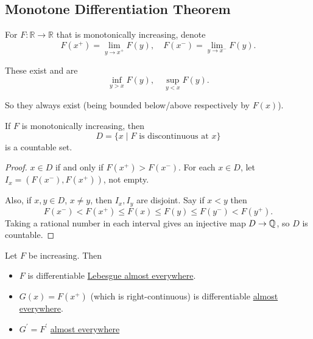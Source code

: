\subsection{Monotone Differentiation Theorem}
\begin{definition}[]\label{def:}
	For \(F \colon  \mathbb{R} \to \mathbb{R}\) that is monotonically increasing, denote
	\[
		F(x^+) = \lim_{y \to x^+} F(y), \quad F(x^-) = \lim_{y \to x^-} F(y).
	\]

	These exist and are
	\[
		\inf_{y > x} F(y),\quad \sup_{y < x} F(y).
	\]

	So they always exist (being bounded below/above respectively by \(F(x)\)).
\end{definition}

\begin{lemma}\label{lma:lec-33}
	If \(F\) is monotonically increasing, then
	\[
		D = \{x \mid F \text{ is discontinuous at } x\}
	\]
	is a countable set.
\end{lemma}

\begin{proof}
	\(x \in D\) if and only if \(F(x^+) > F(x^-)\). For each \(x \in D\), let \(I_x = (F(x^-),F(x^+))\), not empty.

	Also, if \(x,y \in D\), \(x \neq y\), then \(I_x,I_y\) are disjoint. Say if \(x < y\) then
	\[
		F(x^-) < F(x^+) \leq F(x) \leq F(y) \leq F(y^-) < F(y^+).
	\]
	Taking a rational number in each interval gives an injective map \(D \to \mathbb{\MakeUppercase{q}}\), so \(D\) is countable.
\end{proof}

\begin{theorem}\label{thm:monotone-differentiation}
	Let \(F\) be increasing. Then
	\begin{itemize}
		\item \(F\) is differentiable \hyperref[def:mu-almost-everywhere]{Lebesgue almost everywhere}.
		\item \(G(x) = F(x^+)\) (which is right-continuous) is differentiable \hyperref[def:mu-almost-everywhere]{almost everywhere}.
		\item \(G^\prime  = F^\prime \) \hyperref[def:mu-almost-everywhere]{almost everywhere}
	\end{itemize}
\end{theorem}

